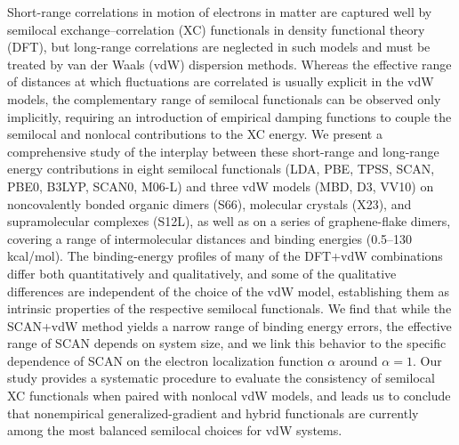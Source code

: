 Short-range correlations in motion of electrons in matter are captured well by semilocal exchange--correlation (XC) functionals in density functional theory (DFT), but long-range correlations are neglected in such models and must be treated by van der Waals (vdW) dispersion methods.
Whereas the effective range of distances at which fluctuations are correlated is usually explicit in the vdW models, the complementary range of semilocal functionals can be observed only implicitly, requiring an introduction of empirical damping functions to couple the semilocal and nonlocal contributions to the XC energy.
We present a comprehensive study of the interplay between these short-range and long-range energy contributions in eight semilocal functionals (LDA, PBE, TPSS, SCAN, PBE0, B3LYP, SCAN0, M06-L) and three vdW models (MBD, D3, VV10) on noncovalently bonded organic dimers (S66), molecular crystals (X23), and supramolecular complexes (S12L), as well as on a series of graphene-flake dimers, covering a range of intermolecular distances and binding energies (0.5--130\,kcal/mol).
The binding-energy profiles of many of the DFT+vdW combinations differ both quantitatively and qualitatively, and some of the qualitative differences are independent of the choice of the vdW model, establishing them as intrinsic properties of the respective semilocal functionals.
We find that while the SCAN+vdW method yields a narrow range of binding energy errors, the effective range of SCAN depends on system size, and we link this behavior to the specific dependence of SCAN on the electron localization function $\alpha$ around $\alpha=1$.
Our study provides a systematic procedure to evaluate the consistency of semilocal XC functionals when paired with nonlocal vdW models, and leads us to conclude that nonempirical generalized-gradient and hybrid functionals are currently among the most balanced semilocal choices for vdW systems.
